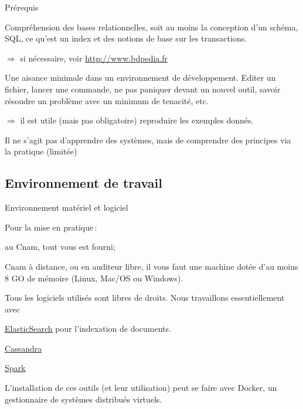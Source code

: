 \begin{frame}{Prérequis}

\begin{redbullet}
   \item \alert{Compréhension des bases relationnelles}, soit au moins la conception d'un schéma, 
      SQL, ce qu'est un index et des notions de base sur les transactions.
      
      $\Rightarrow$ si nécessaire, voir \url{http://www.bdpedia.fr}
      
   \item \alert{Une aisance minimale dans un environnement de développement}. Editer un fichier, lancer une commande, 
      ne pas paniquer devant un nouvel outil, savoir résoudre un problème avec un minimum de tenacité, etc.      

    $\Rightarrow$   il est utile (mais pas \alert{obligatoire}) reproduire les exemples donnés.
      
\end{redbullet}

\begin{blocgauche}
Il ne s'agit pas \alert{d'apprendre} des systèmes, mais de comprendre 
des principes via la pratique (limitée)
\end{blocgauche}

\end{frame}


\subsection{Environnement de travail}
\begin{frame}{Environnement matériel et logiciel}

\alert{Pour la mise en pratique}\,: 

\begin{redbullet}
  \item au Cnam, tout vous est fourni;
  \item Cnam à distance, ou en auditeur libre, il vous faut une machine  dotée d'au moins 8 GO de mémoire (Linux, Mac/OS ou Windows).
\end{redbullet}

\vfill

\alert{Tous les logiciels utilisés sont libres de droits}. Nous travaillons essentiellement avec
\begin{redbullet}
   \item  \href{http://elasticsearch.org}{ElasticSearch} 
      pour l'indexation de documents.
   \item \href{http://cassandra.apache.org}{Cassandra} 
   \item \href{http://spark.apache.org}{Spark}
   \end{redbullet}

\vfill

\begin{blocgauche}
L'installation de ces outils (et leur utilisation) peut se faire avec \alert{Docker}, un
gestionnaire de systèmes distribués virtuels.
\end{blocgauche}
\end{frame}


